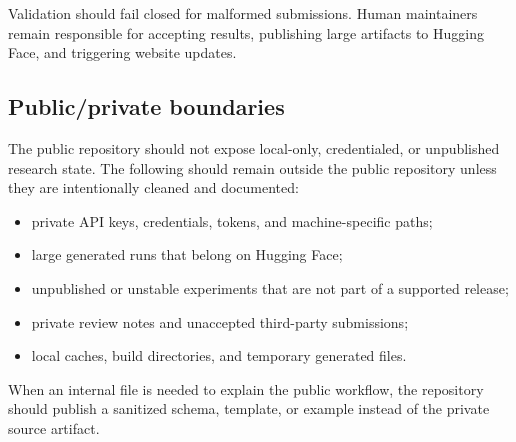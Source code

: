\documentclass[11pt]{article}
\begin{document}
Validation should fail closed for malformed submissions.
Human maintainers remain responsible for accepting results, publishing large artifacts to Hugging Face, and triggering website updates.

\label{sec:public-repository-boundaries}
\subsection*{Public/private boundaries}

The public repository should not expose local-only, credentialed, or unpublished research state.
The following should remain outside the public repository unless they are intentionally cleaned and documented:

\begin{itemize}
\item private API keys, credentials, tokens, and machine-specific paths;
\item large generated runs that belong on Hugging Face;
\item unpublished or unstable experiments that are not part of a supported release;
\item private review notes and unaccepted third-party submissions;
\item local caches, build directories, and temporary generated files.
\end{itemize}

When an internal file is needed to explain the public workflow, the repository should publish a sanitized schema, template, or example instead of the private source artifact.
\end{document}
